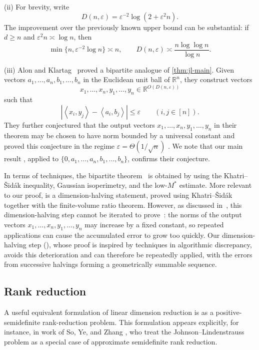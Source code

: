 \documentclass[11pt,reqno,letterpaper]{amsart}
\newcommand{\R}{\mathbb R}
\newcommand{\abs}[1]{\left\lvert #1\right\rvert}
\newcommand{\ip}[2]{\left\langle #1,#2\right\rangle}
\newcommand{\Dfun}[2]{D(#1,#2)}
\begin{document}
\smallskip

{(ii)} For brevity, write
\begin{equation}\label{eq:dimension-function}
 \Dfun{n}{\varepsilon}
 =
 \varepsilon^{-2}\log(2+\varepsilon^2n).
\end{equation}
The improvement over the previously known upper bound can be substantial:
if $d\geq n$ and $\varepsilon^2n\asymp\log n$, then
\[
 \min\{n,\varepsilon^{-2}\log n\}\asymp n,
 \qquad
 \Dfun{n}{\varepsilon}
 \asymp
 \frac{n\log\log n}{\log n}.
\]

\smallskip

{(iii)} Alon and Klartag~\cite[Theorem~1.2]{AK} proved a
bipartite analogue of \cref{thm:jl-main}. Given vectors
\(a_1,\ldots,a_n,b_1,\ldots,b_n\) in the Euclidean unit ball of $\R^n$, they
construct vectors
\[
 x_1,\ldots,x_n,y_1,\ldots,y_n
 \in \R^{O(\Dfun{n}{\varepsilon})}
\]
such that
\[
 \abs{\ip{x_i}{y_j}-\ip{a_i}{b_j}}
 \leq \varepsilon
 \qquad (i,j\in[n]).
\]
They further conjectured \cite[Conjecture~2.4]{AK} that the output vectors $x_1,\dots,x_n, y_1,\dots,y_n$ in their theorem may be chosen to have norm bounded by a universal constant and proved this conjecture in the regime $\varepsilon = \Theta(1/\sqrt{n})$ \cite[Theorem~2.5]{AK}. We note that our main result , applied to $\{0,a_1,\dots,a_n, b_1,\dots, b_n\}$, confirms their conjecture.  

In terms of techniques, the bipartite theorem~\cite[Theorem~1.2]{AK} is obtained by using the Khatri--Šidák inequality, Gaussian isoperimetry, and the low-$M^*$ estimate. More relevant to our proof, \cite[Theorem~2.5]{AK} is a dimension-halving statement, proved using
Khatri--Šidák together with the finite-volume ratio theorem. However,
as discussed in~\cite[Section~7]{AK}, this dimension-halving step
cannot be iterated to prove~\cite[Conjecture~2.4]{AK}: the norms of the output vectors $x_1,\dots,x_n, y_1,\dots, y_n$ may increase by a fixed constant, so repeated applications can cause the accumulated error to grow too
quickly. Our dimension-halving step (), whose proof is inspired by techniques in algorithmic discrepancy, avoids this deterioration and can therefore be repeatedly applied, with the errors from successive halvings forming a geometrically summable sequence.  





\subsection{Rank reduction}
A useful equivalent formulation of linear dimension reduction is as a
positive-semidefinite rank-reduction problem. This formulation appears
explicitly, for instance, in work of So, Ye, and Zhang \cite{SYZ}, who
treat the Johnson--Lindenstrauss problem as a special case of approximate
semidefinite rank reduction.
\end{document}
